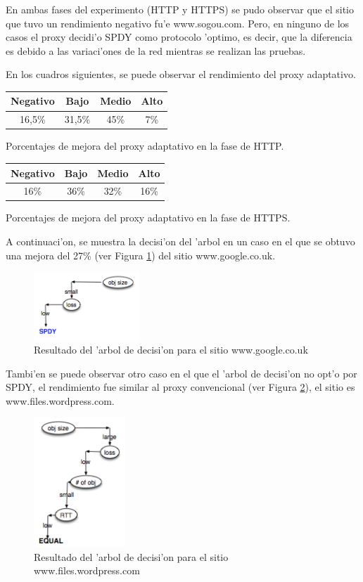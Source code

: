 \clearpage

En ambas fases del experimento (HTTP y HTTPS) se pudo observar que el sitio que tuvo un rendimiento negativo fu'e www.sogou.com. Pero, en ninguno de los casos el proxy decidi'o SPDY como protocolo 'optimo, es decir, que la diferencia es debido a las variaci'ones de la red mientras se realizan las pruebas.

En los cuadros siguientes, se puede observar el rendimiento del proxy adaptativo.

\begin{center}
\begin{tabular}{| c | c | c | c |}
  \hline
  Negativo & Bajo & Medio & Alto \\
  \hline
  16,5\% & 31,5\% & 45\% & 7\%\\
  \hline
\end{tabular}

Porcentajes de mejora del proxy adaptativo en la fase de HTTP.
\end{center}

\begin{center}
\begin{tabular}{| c | c | c | c |}
  \hline
  Negativo & Bajo & Medio & Alto \\
  \hline
  16\% & 36\% & 32\% & 16\%\\
  \hline
\end{tabular}

Porcentajes de mejora del proxy adaptativo en la fase de HTTPS.
\end{center}

A continuaci'on, se muestra la decisi'on del 'arbol en un caso en el que se obtuvo una mejora del 27\% (ver Figura \ref{arbolBueno}) del sitio www.google.co.uk.

\begin{figure}[h!]
  	\centering
	\includegraphics[width=150px]{img/arbolBueno}
	\caption{\small Resultado del 'arbol de decisi'on para el sitio www.google.co.uk}
	\label{arbolBueno}
\end{figure}

\clearpage

Tambi'en se puede observar otro caso en el que el 'arbol de decisi'on no opt'o por SPDY, el rendimiento fue similar al proxy convencional (ver Figura \ref{arbolMalo}), el sitio es www.files.wordpress.com.

\begin{figure}[h!]
  	\centering
	\includegraphics[width=130px]{img/arbolMalo}
	\caption{\small Resultado del 'arbol de decisi'on para el sitio www.files.wordpress.com}
	\label{arbolMalo}
\end{figure}
